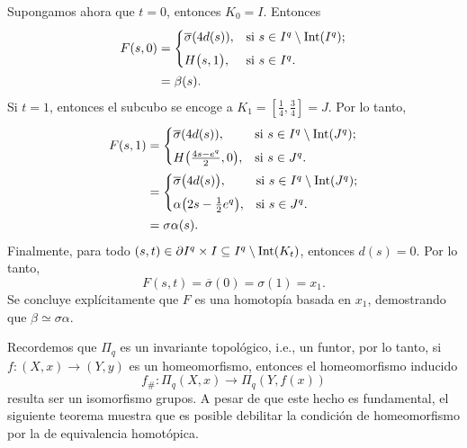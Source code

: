 \begin{dem}
    Supongamos ahora que $t=0$, entonces $K_0 = I$. Entonces
    \begin{align*}
        F(s, 0) &= 
        \begin{cases}
            \overline{\sigma}(4d(s)), & \text{si } s \in I^q \setminus \mathrm{Int}(I^q); \\[1ex]
            H\big( s, 1 \big), & \text{si } s \in I^q.
        \end{cases}\\
        &=\beta(s).
    \end{align*} 
    Si $t=1$, entonces el subcubo se encoge a $K_1 = [\frac{1}{4}, \frac{3}{4}] = J$. Por lo tanto,
    \begin{align*}
        F(s, 1) &= 
        \begin{cases}
            \overline{\sigma}(4d(s)), & \text{si } s \in I^q \setminus \mathrm{Int}(J^q); \\[1ex]
            H\big( \frac{4s - e^q}{2}, 0 \big), & \text{si } s \in J^q.
        \end{cases}\\
        &= 
        \begin{cases}
            \overline{\sigma}\big(4d(s)\big), & \text{si } s \in I^q \setminus \mathrm{Int}(J^q); \\[1ex]
            \alpha\big(2s-\frac{1}{2}e^q\big), & \text{si } s \in J^q.
        \end{cases}\\
        &=\sigma\alpha(s).
    \end{align*} 
    Finalmente, para todo $(s,t) \in \partial I^q\times I\subseteq I^q\setminus\mathrm{Int}(K_t)$, entonces $d(s) = 0$. Por lo tanto,
    \[
        F(s, t) = \overline{\sigma}(0) = \sigma(1) = x_1.
    \]
    Se concluye explícitamente que $F$ es una homotopía basada en $x_1$, demostrando que $\beta \simeq \sigma\alpha$.
\end{dem}
Recordemos que $\Pi_q$ es un invariante topológico, i.e., un funtor, por lo tanto, si $f:(X,x)\to(Y,y)$ es un homeomorfismo, entonces el homeomorfismo inducido $$f_{\#}:\Pi_q(X,x)\to\Pi_q(Y,f(x))$$ 
resulta ser un isomorfismo grupos. A pesar de que este hecho es fundamental, el siguiente teorema muestra que es posible debilitar la condición de homeomorfismo por la de equivalencia homotópica.

